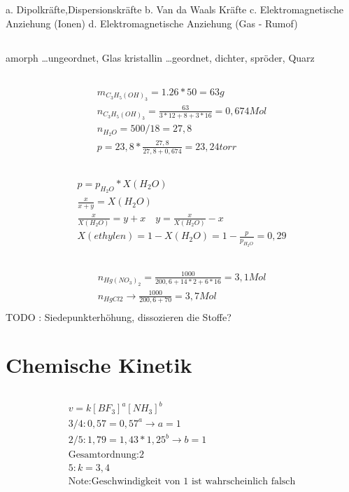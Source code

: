 \documentclass[a4paper]{article}
\begin{document}
\subsection{}
a. Dipolkräfte,Dispersionskräfte
b. Van da Waals Kräfte
c. Elektromagnetische Anziehung (Ionen)
d. Elektromagnetische Anziehung (Gas - Rumof)

\subsection{}
amorph \dots ungeordnet, Glas
kristallin \dots geordnet, dichter, spröder, Quarz

\subsection{}
\begin{align}
  m_{C_3H_5(OH)_3}=1.26*50=63g\\
  n_{C_3H_5(OH)_3}=\frac{63}{3*12+8+3*16}=0,674Mol\\
  n_{H_2O}=500/18=27,8\\
  p=23,8*\frac{27,8}{27,8+0,674}= 23,24 torr
\end{align}

\subsection{}
\begin{align}
  p=p_{H_2O}*X(H_2O)\\
  \frac{x}{x+y}=X(H_2O)\\
  \frac{x}{X(H_2O)}=y+x \quad y=\frac{x}{X(H_2O)}-x\\
  X(ethylen)=1-X(H_2O)=1-\frac{p}{p_{H_2O}}=0,29
\end{align}

\subsection{}
\begin{align}
n_{Hg(NO_3)_2}=\frac{1000}{200,6+14*2+6*16}=3,1 Mol\\
n_{HgCl2} \rightarrow \frac{1000}{200,6+70}=3,7Mol\\
\end{align}
TODO : Siedepunkterhöhung, dissozieren die Stoffe?

\section{Chemische Kinetik}
\subsection{}
\begin{align}
  v=k [BF_3]^a[NH_3]^b\\
  3/4:0,57=0,57^a \rightarrow a=1\\
  2/5:1,79=1,43*1,25^b \rightarrow b=1\\
  \text{Gesamtordnung:2}\\
  5:k=3,4\\
  \text{Note:Geschwindigkeit von 1 ist wahrscheinlich falsch}
\end{align}
\end{document}
